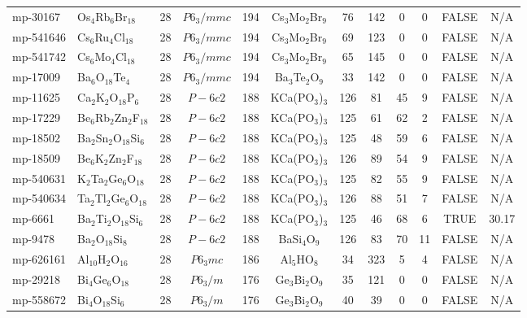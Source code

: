 {\begin{longtable}{llcccccccccc}
    mp-30167 & Os$_{4}$Rb$_{6}$Br$_{18}$ & 28    & $P6_3/mmc$ & 194   & Cs$_{3}$Mo$_{2}$Br$_{9}$ & 76    & 142   & 0     & 0     & FALSE & N/A \\
    mp-541646 & Cs$_{6}$Ru$_{4}$Cl$_{18}$ & 28    & $P6_3/mmc$ & 194   & Cs$_{3}$Mo$_{2}$Br$_{9}$ & 69    & 123   & 0     & 0     & FALSE & N/A \\
    mp-541742 & Cs$_{6}$Mo$_{4}$Cl$_{18}$ & 28    & $P6_3/mmc$ & 194   & Cs$_{3}$Mo$_{2}$Br$_{9}$ & 65    & 145   & 0     & 0     & FALSE & N/A \\
    mp-17009 & Ba$_{6}$O$_{18}$Te$_{4}$ & 28    & $P6_3/mmc$ & 194   & Ba$_{3}$Te$_{2}$O$_{9}$ & 33    & 142   & 0     & 0     & FALSE & N/A \\
    mp-11625 & Ca$_{2}$K$_{2}$O$_{18}$P$_{6}$ & 28    & $P-6c2$ & 188   & KCa(PO$_{3}$)$_{3}$ & 126   & 81    & 45    & 9     & FALSE & N/A \\
    mp-17229 & Be$_{6}$Rb$_{2}$Zn$_{2}$F$_{18}$ & 28    & $P-6c2$ & 188   & KCa(PO$_{3}$)$_{3}$ & 125   & 61    & 62    & 2     & FALSE & N/A \\
    mp-18502 & Ba$_{2}$Sn$_{2}$O$_{18}$Si$_{6}$ & 28    & $P-6c2$ & 188   & KCa(PO$_{3}$)$_{3}$ & 125   & 48    & 59    & 6     & FALSE & N/A \\
    mp-18509 & Be$_{6}$K$_{2}$Zn$_{2}$F$_{18}$ & 28    & $P-6c2$ & 188   & KCa(PO$_{3}$)$_{3}$ & 126   & 89    & 54    & 9     & FALSE & N/A \\
    mp-540631 & K$_{2}$Ta$_{2}$Ge$_{6}$O$_{18}$ & 28    & $P-6c2$ & 188   & KCa(PO$_{3}$)$_{3}$ & 125   & 82    & 55    & 9     & FALSE & N/A \\
    mp-540634 & Ta$_{2}$Tl$_{2}$Ge$_{6}$O$_{18}$ & 28    & $P-6c2$ & 188   & KCa(PO$_{3}$)$_{3}$ & 126   & 88    & 51    & 7     & FALSE & N/A \\
    mp-6661 & Ba$_{2}$Ti$_{2}$O$_{18}$Si$_{6}$ & 28    & $P-6c2$ & 188   & KCa(PO$_{3}$)$_{3}$ & 125   & 46    & 68    & 6     & TRUE  & 30.17  \\
    mp-9478 & Ba$_{2}$O$_{18}$Si$_{8}$ & 28    & $P-6c2$ & 188   & BaSi$_{4}$O$_{9}$ & 126   & 83    & 70    & 11    & FALSE & N/A \\
    mp-626161 & Al$_{10}$H$_{2}$O$_{16}$ & 28    & $P6_3mc$ & 186   & Al$_{5}$HO$_{8}$ & 34    & 323   & 5     & 4     & FALSE & N/A \\
    mp-29218 & Bi$_{4}$Ge$_{6}$O$_{18}$ & 28    & $P6_3/m$ & 176   & Ge$_{3}$Bi$_{2}$O$_{9}$ & 35    & 121   & 0     & 0     & FALSE & N/A \\
    mp-558672 & Bi$_{4}$O$_{18}$Si$_{6}$ & 28    & $P6_3/m$ & 176   & Ge$_{3}$Bi$_{2}$O$_{9}$ & 40    & 39    & 0     & 0     & FALSE & N/A \\

\end{longtable}}
